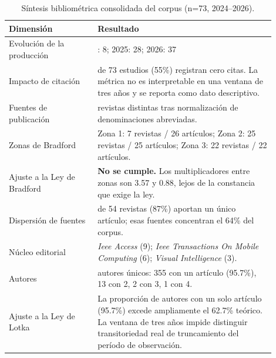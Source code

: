 \begin{table}[H]
\centering
\caption{Síntesis bibliométrica consolidada del corpus (n=73, 2024--2026).}
\label{tab:bibliometria}
\small
\renewcommand{\arraystretch}{1.35}
\begin{tabular}{|>{\raggedright\arraybackslash}m{0.30\linewidth}|>{\raggedright\arraybackslash}m{0.60\linewidth}|}
\hline
\textbf{Dimensión} & \textbf{Resultado} \\
\hline
Evolución de la producción & 2024: 8; 2025: 28; 2026: 37 \\
\hline
Impacto de citación & 40 de 73 estudios (55\%) registran cero citas. La métrica no es interpretable en una ventana de tres años y se reporta como dato descriptivo. \\
\hline
Fuentes de publicación & 54 revistas distintas tras normalización de denominaciones abreviadas. \\
\hline
Zonas de Bradford & Zona 1: 7 revistas / 26 artículos; Zona 2: 25 revistas / 25 artículos; Zona 3: 22 revistas / 22 artículos. \\
\hline
Ajuste a la Ley de Bradford & \textbf{No se cumple.} Los multiplicadores entre zonas son 3.57 y 0.88, lejos de la constancia que exige la ley. \\
\hline
Dispersión de fuentes & 47 de 54 revistas (87\%) aportan un único artículo; esas fuentes concentran el 64\% del corpus. \\
\hline
Núcleo editorial & \emph{Ieee Access} (9); \emph{Ieee Transactions On Mobile Computing} (6); \emph{Visual Intelligence} (3). \\
\hline
Autores & 371 autores únicos: 355 con un artículo (95.7\%), 13 con 2, 2 con 3, 1 con 4. \\
\hline
Ajuste a la Ley de Lotka & La proporción de autores con un solo artículo (95.7\%) excede ampliamente el 62.7\% teórico. La ventana de tres años impide distinguir transitoriedad real de truncamiento del período de observación. \\
\hline
\end{tabular}
\end{table}
